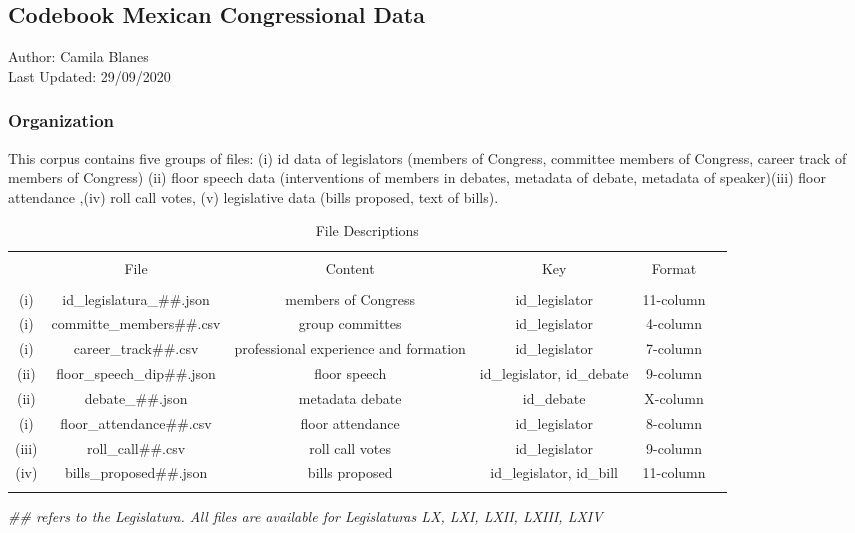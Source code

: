 \documentclass{article}
\begin{document}
\subsection*{Codebook Mexican Congressional Data }
Author: Camila Blanes\\
Last Updated: 29/09/2020

\subsubsection*{Organization}
This corpus contains five groups of files: (i) id data of legislators (members of Congress, committee members of Congress, career track of members of Congress) (ii) floor speech data (interventions of members in debates, metadata of debate, metadata of speaker)(iii) floor attendance ,(iv) roll call votes, (v) legislative data (bills proposed, text of bills). 

\begin{table}[!htbp] \centering 
	\caption{File Descriptions}
	\begin{tabular}{@{\extracolsep{5pt}} cccccc} 
		\\[-1.8ex]\hline 
		\hline \\[-1.8ex] 
		& File & Content  & Key & Format \\ 
		\hline \\[-1.8ex] 
		(i) & id\_legislatura\_\#\#.json  & members of Congress  & id\_legislator  & 11-column   \\
		(i) & committe\_members\#\#.csv & group committes & id\_legislator& 4-column \\	
		(i) & career\_track\#\#.csv & professional experience and formation & id\_legislator& 7-column\\	
		(ii) & floor\_speech\_dip\#\#.json  &  floor speech & id\_legislator, id\_debate  &   9-column \\ 
		(ii) & debate\_\#\#.json& metadata debate &id\_debate  &  X-column  \\
		(i)& floor\_attendance\#\#.csv & floor attendance& id\_legislator&8-column \\
		(iii)&roll\_call\#\#.csv  & roll call votes & id\_legislator& 9-column\\
		(iv)& bills\_proposed\#\#.json& bills proposed  &  id\_legislator, id\_bill & 11-column\\	
		\hline \\[-1.8ex] 
	\end{tabular} 
	\textit{\#\# refers to the Legislatura. All files are available for Legislaturas LX, LXI, LXII, LXIII, LXIV}
\end{table} 
\end{document}
